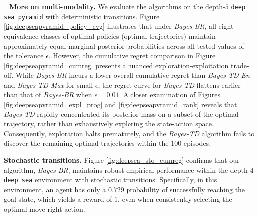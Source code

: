 \documentclass{amsart}
\begin{document}
=\textbf{More on multi-modality.} We evaluate the algorithms on the depth-$5$ \texttt{deep sea pyramid} with deterministic transitions. Figure \ref{fig:deepseapyramid_policy_cvg} illustrates that under \textit{Bayes-BR}, all eight equivalence classes of optimal policies (optimal trajectories) maintain approximately equal marginal posterior probabilities across all tested values of the tolerance $\epsilon$. However, the cumulative regret comparison in Figure \ref{fig:deepseapyramid_cumreg} presents a nuanced exploration-exploitation trade-off. While \textit{Bayes-BR} incurs a lower overall cumulative regret than \textit{Bayes-TD-En} and \textit{Bayes-TD-Max} for small $\epsilon$, the regret curve for \textit{Bayes-TD} flattens earlier than that of \textit{Bayes-BR} when $\epsilon=0.01$. A closer examination of Figures \ref{fig:deepseapyramid_expl_prog} and \ref{fig:deepseapyramid_rank} reveals that \textit{Bayes-TD} rapidly concentrated its posterior mass on a subset of the optimal trajectory, rather than exhaustively exploring the state-action space. Consequently, exploration halts prematurely, and the \textit{Bayes-TD} algorithm fails to discover the remaining optimal trajectories within the $100$ episodes.

\textbf{Stochastic transitions.} Figure \ref{fig:deepsea_sto_cumreg} confirms that our algorithm, \textit{Bayes-BR}, maintains robust empirical performance within the depth-$4$
\texttt{deep sea} environment with stochastic transitions. Specifically, in this environment, an agent has only a $0.729$ probability of successfully reaching the goal state, which yields a reward of $1$, even when consistently selecting the optimal move-right action.
\end{document}

